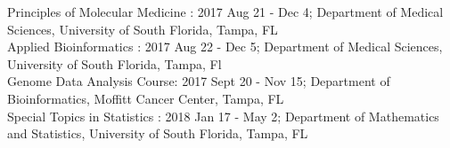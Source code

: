 \documentclass[11pt, a4paper]{article} %
\begin{document}
Principles of Molecular Medicine : 2017 Aug 21 - Dec 4; Department of Medical Sciences, University of South Florida, Tampa, FL\\

Applied Bioinformatics : 2017 Aug 22 - Dec 5; Department of Medical Sciences, University of South Florida, Tampa, Fl \\

Genome Data Analysis Course:  2017 Sept 20 - Nov 15; Department of Bioinformatics, Moffitt Cancer Center, Tampa, FL \\

Special Topics in Statistics :  2018 Jan 17 -  May 2; Department of Mathematics and Statistics, University of South Florida, Tampa, FL





\end{document}
